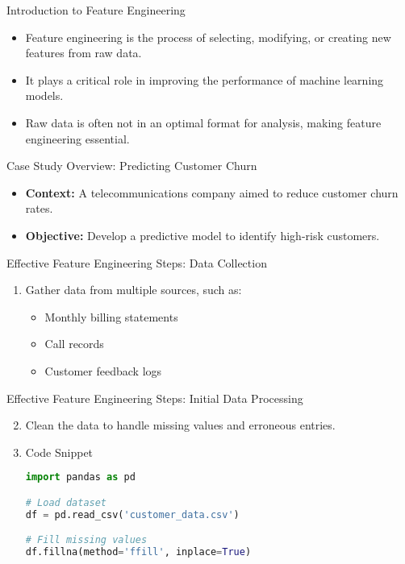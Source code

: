 \documentclass[aspectratio=169]{beamer}
\begin{document}
\begin{frame}{Introduction to Feature Engineering}
    \begin{itemize}
        \item Feature engineering is the process of selecting, modifying, or creating new features from raw data.
        \item It plays a critical role in improving the performance of machine learning models.
        \item Raw data is often not in an optimal format for analysis, making feature engineering essential.
    \end{itemize}
\end{frame}

\begin{frame}{Case Study Overview: Predicting Customer Churn}
    \begin{itemize}
        \item \textbf{Context:} A telecommunications company aimed to reduce customer churn rates.
        \item \textbf{Objective:} Develop a predictive model to identify high-risk customers.
    \end{itemize}
\end{frame}

\begin{frame}{Effective Feature Engineering Steps: Data Collection}
    \begin{enumerate}
        \item Gather data from multiple sources, such as:
            \begin{itemize}
                \item Monthly billing statements
                \item Call records
                \item Customer feedback logs
            \end{itemize}
    \end{enumerate}
\end{frame}

\begin{frame}[fragile]{Effective Feature Engineering Steps: Initial Data Processing}
    \begin{enumerate}
        \setcounter{enumi}{1}
        \item Clean the data to handle missing values and erroneous entries.
        \item \begin{block}{Code Snippet}
            \begin{lstlisting}[language=Python]
import pandas as pd

# Load dataset
df = pd.read_csv('customer_data.csv')

# Fill missing values
df.fillna(method='ffill', inplace=True)
            \end{lstlisting}
        \end{block}
    \end{enumerate}
\end{frame}
\end{document}
